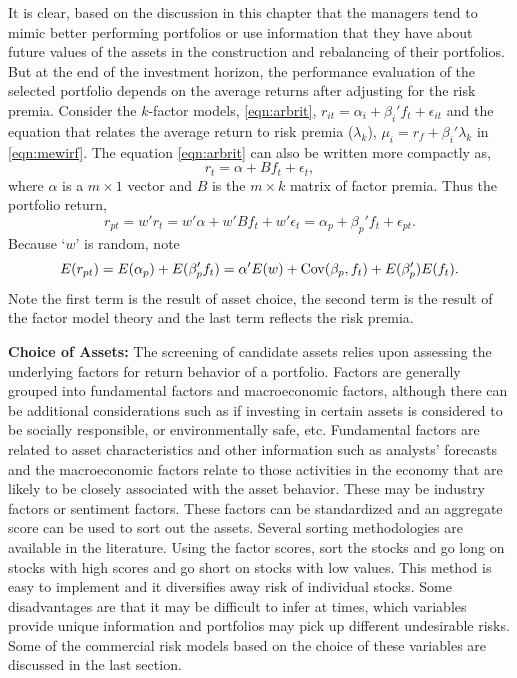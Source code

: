 It is clear, based on the discussion in this chapter that the managers tend to mimic better performing portfolios or use information that they have about future values of the assets in the construction and rebalancing of their portfolios. But at the end of the investment horizon, the performance evaluation of the selected portfolio depends on the average returns after adjusting for the risk premia. Consider the $k$-factor models, \eqref{eqn:arbrit}, $r_{it}= \alpha_i + \beta_i' f_t + \epsilon_{it}$ and the equation that relates the average return to risk premia ($\lambda_k$), $\mu_i=r_f + \beta_i' \lambda_k$ in \eqref{eqn:mewirf}. The equation \eqref{eqn:arbrit} can also be written more compactly as,
	\begin{equation} \label{eqn:compactarb}
	r_t= \alpha + B f_t + \epsilon_t,
	\end{equation}
where $\alpha$ is a $m \times 1$ vector and $B$ is the $m \times k$ matrix of factor premia. Thus the portfolio return,
	\begin{equation} \label{eqn:portreturn1}
	r_{pt}= w'r_t = w' \alpha+ w'B f_t + w' \epsilon_t= \alpha_p + \beta_p' f_t + \epsilon_{pt}.
	\end{equation}
Because `$w$' is random, note
	\begin{equation} \label{eqn:portreturnrandom}
	E(r_{pt})= E(\alpha_p) + E(\beta_p' f_t)= \alpha' E(w)+ \cov(\beta_p,f_t) + E(\beta_p') E(f_t).
	\end{equation}
Note the first term is the result of asset choice, the second term is the result of the factor model theory and the last term reflects the risk premia. \twomedskip


\noindent\textbf{Choice of Assets:} The screening of candidate assets relies upon assessing the underlying factors for return behavior of a portfolio. Factors are generally grouped into fundamental factors and macroeconomic factors, although there can be additional considerations such as if investing in certain assets is considered to be socially responsible, or environmentally safe, etc. Fundamental factors are related to asset characteristics and other information such as analysts' forecasts and the macroeconomic factors relate to those activities in the economy that are likely to be closely associated with the asset behavior. These may be industry factors or sentiment factors. These factors can be standardized and an aggregate score can be used to sort out the assets. Several sorting methodologies are available in the literature. Using the factor scores, sort the stocks and go long on stocks with high scores and go short on stocks with low values. This method is easy to implement and it diversifies away risk of individual stocks. Some disadvantages are that it may be difficult to infer at times, which variables provide unique information and portfolios may pick up different undesirable risks. Some of the commercial risk models based on the choice of these variables are discussed in the last section.


